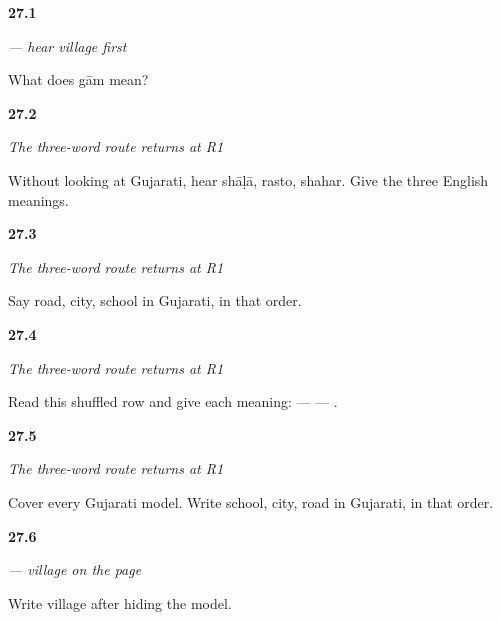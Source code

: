 \noindent\begin{minipage}[t]{\linewidth}
\raggedright
\hypertarget{review-GU-C23-hear-gaam-recall}{\textbf{27.1}} \emph{ — hear village first}\par
\small What does gām mean?
\end{minipage}\par\medskip

\noindent\begin{minipage}[t]{\linewidth}
\raggedright
\hypertarget{review-GU-R23-route-three-r1-listening}{\textbf{27.2}} \emph{The three-word route returns at R1}\par
\small Without looking at Gujarati, hear shāḷā, rasto, shahar. Give the three English meanings.
\end{minipage}\par\medskip

\noindent\begin{minipage}[t]{\linewidth}
\raggedright
\hypertarget{review-GU-R23-route-three-r1-speaking}{\textbf{27.3}} \emph{The three-word route returns at R1}\par
\small Say road, city, school in Gujarati, in that order.
\end{minipage}\par\medskip

\noindent\begin{minipage}[t]{\linewidth}
\raggedright
\hypertarget{review-GU-R23-route-three-r1-reading}{\textbf{27.4}} \emph{The three-word route returns at R1}\par
\small Read this shuffled row and give each meaning:  —  — .
\end{minipage}\par\medskip

\noindent\begin{minipage}[t]{\linewidth}
\raggedright
\hypertarget{review-GU-R23-route-three-r1-writing}{\textbf{27.5}} \emph{The three-word route returns at R1}\par
\small Cover every Gujarati model. Write school, city, road in Gujarati, in that order.
\end{minipage}\par\medskip

\noindent\begin{minipage}[t]{\linewidth}
\raggedright
\hypertarget{review-GU-C23-gaam-delayed}{\textbf{27.6}} \emph{ — village on the page}\par
\small Write village after hiding the model.
\end{minipage}\par\medskip

